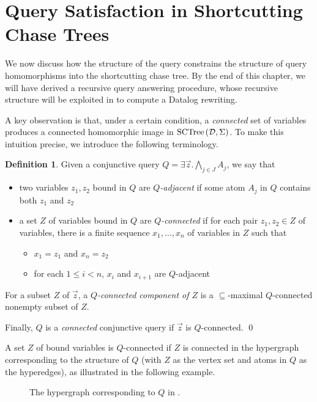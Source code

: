 \documentclass[12pt]{report}
\theoremstyle{plain}
\theoremstyle{definition}
\newtheorem{definition}[theorem]{Definition}
\newcommand{\SCTree}[2]{\ensuremath{\normalfont{\textrm{SCTree}} \left( #1, #2 \right)}}
\begin{document}
\section{Query Satisfaction in Shortcutting Chase Trees}

We now discuss how the structure of the query constrains the structure of query homomorphisms into the shortcutting chase tree. By the end of this chapter, we will have derived a recursive query answering procedure, whose recursive structure will be exploited in  to compute a Datalog rewriting.

A key observation is that, under a certain condition, a \emph{connected} set of variables produces a connected homomorphic image in $\SCTree{\mathcal{D}}{\Sigma}$. To make this intuition precise, we introduce the following terminology.

\begin{definition}
  Given a conjunctive query $Q = \exists \vec{z}. \bigwedge_{j \in J} A_j$, we say that
  \begin{itemize}
    \item two variables $z_1, z_2$ bound in $Q$ are \emph{$Q$-adjacent} if some atom $A_j$ in $Q$ contains both $z_1$ and $z_2$
    \item a set $Z$ of variables bound in $Q$ are \emph{$Q$-connected} if for each pair $z_1, z_2 \in Z$ of variables, there is a finite sequence $x_1, \ldots, x_n$ of variables in $Z$ such that
    \begin{itemize}
      \item $x_1 = z_1$ and $x_n = z_2$
      \item for each $1 \leq i < n$, $x_i$ and $x_{i+1}$ are $Q$-adjacent
    \end{itemize}
  \end{itemize}

  For a subset $Z$ of $\vec{z}$, a \emph{$Q$-connected component of $Z$} is a $\subseteq$-maximal $Q$-connected nonempty subset of $Z$.

  Finally, $Q$ is a \emph{connected} conjunctive query if $\vec{z}$ is $Q$-connected.
  \qed
\end{definition}

A set $Z$ of bound variables is $Q$-connected if $Z$ is connected in the hypergraph corresponding to the structure of $Q$ (with $Z$ as the vertex set and atoms in $Q$ as the hyperedges), as illustrated in the following example.

\begin{figure}[ht]
  \centering
  
  \caption{The hypergraph corresponding to $Q$ in .}
\end{figure}
\end{document}
